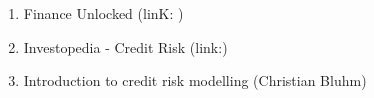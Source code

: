 \documentclass[a4paper,12pt]{article}
\begin{document}
    \begin{enumerate}
        \item Finance Unlocked (linK: )
        \item Investopedia - Credit Risk (link:)
        \item Introduction to credit risk modelling (Christian Bluhm)
    \end{enumerate}
\end{document}
